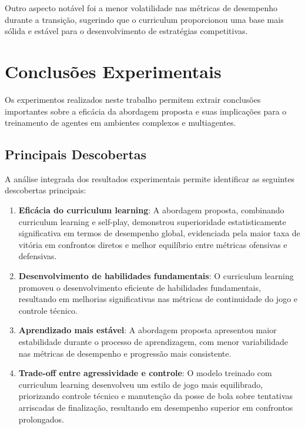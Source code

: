 Outro aspecto notável foi a menor volatilidade nas métricas de desempenho durante a transição, sugerindo que o curriculum proporcionou uma base mais sólida e estável para o desenvolvimento de estratégias competitivas.

\section{Conclusões Experimentais}
\label{sec:conclusoes_experimentais}

Os experimentos realizados neste trabalho permitem extrair conclusões importantes sobre a eficácia da abordagem proposta e suas implicações para o treinamento de agentes em ambientes complexos e multiagentes.

\subsection{Principais Descobertas}

A análise integrada dos resultados experimentais permite identificar as seguintes descobertas principais:

\begin{enumerate}
    \item \textbf{Eficácia do curriculum learning}: A abordagem proposta, combinando curriculum learning e self-play, demonstrou superioridade estatisticamente significativa em termos de desempenho global, evidenciada pela maior taxa de vitória em confrontos diretos e melhor equilíbrio entre métricas ofensivas e defensivas.
    
    \item \textbf{Desenvolvimento de habilidades fundamentais}: O curriculum learning promoveu o desenvolvimento eficiente de habilidades fundamentais, resultando em melhorias significativas nas métricas de continuidade do jogo e controle técnico.
    
    \item \textbf{Aprendizado mais estável}: A abordagem proposta apresentou maior estabilidade durante o processo de aprendizagem, com menor variabilidade nas métricas de desempenho e progressão mais consistente.
    
    \item \textbf{Trade-off entre agressividade e controle}: O modelo treinado com curriculum learning desenvolveu um estilo de jogo mais equilibrado, priorizando controle técnico e manutenção da posse de bola sobre tentativas arriscadas de finalização, resultando em desempenho superior em confrontos prolongados.
\end{enumerate}

